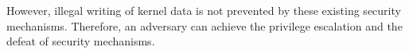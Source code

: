   However, illegal writing of kernel data is not prevented by these existing
  security mechanisms.
  Therefore, an adversary can achieve the privilege escalation and the defeat of
  security mechanisms.
